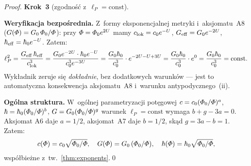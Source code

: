 \begin{proof}
\smallskip
\textbf{Krok~3} (zgodno\'s\'c z~$\ell_P = \text{const}$).

\smallskip\noindent
\textbf{Weryfikacja bezpo\'srednia.}
Z~formy eksponencjalnej metryki i~aksjomatu~A8
($G(\varPhi) = G_0\,\varPhi_0/\varPhi$):
przy $\varPhi = \varPhi_0 e^{2U}$ mamy
$c_{\rm lok} = c_0 e^{-U}$,\;
$G_{\rm eff} = G_0 e^{-2U}$,\;
$\hbar_{\rm eff} = \hbar_0 e^{-U}$.\;
Zatem:
\begin{equation}
  \ell_P^2 = \frac{G_{\rm eff}\,\hbar_{\rm eff}}{c_{\rm lok}^3}
  = \frac{G_0 e^{-2U} \cdot \hbar_0 e^{-U}}{c_0^3 e^{-3U}}
  = \frac{G_0\hbar_0}{c_0^3}\cdot e^{-2U - U + 3U}
  = \frac{G_0\hbar_0}{c_0^3}\cdot e^{0}
  = \frac{G_0\hbar_0}{c_0^3} = \text{const}.
\end{equation}
Wyk\l{}adnik zeruje si\k{e} \emph{dok\l{}adnie}, bez
dodatkowych warunk\'ow --- jest to automatyczna
konsekwencja aksjomatu~A8 i~warunku antypodycznego~(ii).

\smallskip\noindent
\textbf{Og\'olna struktura.}
W~og\'olnej parametryzacji pot\k{e}gowej
$c = c_0(\varPhi_0/\varPhi)^a$,\;
$\hbar = \hbar_0(\varPhi_0/\varPhi)^b$,\;
$G = G_0(\varPhi_0/\varPhi)^g$
warunek $\ell_P = \text{const}$ wymaga
$b + g - 3a = 0$.
Aksjomat A6 daje $a = 1/2$, aksjomat~A7 daje $b = 1/2$,
sk\k{a}d $g = 3a - b = 1$.
Zatem:
\begin{equation}
  c(\varPhi) = c_0\sqrt{\varPhi_0/\varPhi}, \quad
  G(\varPhi) = G_0\,(\varPhi_0/\varPhi), \quad
  \hbar(\varPhi) = \hbar_0\sqrt{\varPhi_0/\varPhi},
\end{equation}
wsp\'o\l{}bie\.zne z~tw.~\ref{thm:exponents}.\qed
\end{proof}

